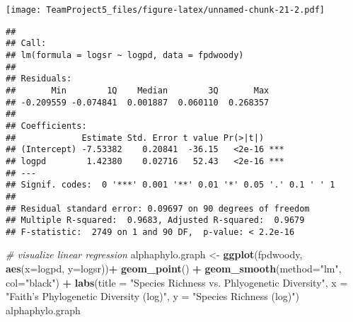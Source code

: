 \documentclass[
]{article}
\newenvironment{Shaded}{\begin{snugshade}}{\end{snugshade}}
\newcommand{\CommentTok}[1]{\textcolor[rgb]{0.56,0.35,0.01}{\textit{#1}}}
\newcommand{\DataTypeTok}[1]{\textcolor[rgb]{0.13,0.29,0.53}{#1}}
\newcommand{\KeywordTok}[1]{\textcolor[rgb]{0.13,0.29,0.53}{\textbf{#1}}}
\newcommand{\NormalTok}[1]{#1}
\newcommand{\OperatorTok}[1]{\textcolor[rgb]{0.81,0.36,0.00}{\textbf{#1}}}
\newcommand{\StringTok}[1]{\textcolor[rgb]{0.31,0.60,0.02}{#1}}
\begin{document}
\texttt{[image: TeamProject5\_files/figure-latex/unnamed-chunk-21-2.pdf]}

\begin{Shaded}
\end{Shaded}

\begin{verbatim}
## 
## Call:
## lm(formula = logsr ~ logpd, data = fpdwoody)
## 
## Residuals:
##       Min        1Q    Median        3Q       Max 
## -0.209559 -0.074841  0.001887  0.060110  0.268357 
## 
## Coefficients:
##             Estimate Std. Error t value Pr(>|t|)    
## (Intercept) -7.53382    0.20841  -36.15   <2e-16 ***
## logpd        1.42380    0.02716   52.43   <2e-16 ***
## ---
## Signif. codes:  0 '***' 0.001 '**' 0.01 '*' 0.05 '.' 0.1 ' ' 1
## 
## Residual standard error: 0.09697 on 90 degrees of freedom
## Multiple R-squared:  0.9683, Adjusted R-squared:  0.9679 
## F-statistic:  2749 on 1 and 90 DF,  p-value: < 2.2e-16
\end{verbatim}

\begin{Shaded}
\begin{Highlighting}[]
\CommentTok{# visualize linear regression}
\NormalTok{alphaphylo.graph <-}\StringTok{ }\KeywordTok{ggplot}\NormalTok{(fpdwoody, }\KeywordTok{aes}\NormalTok{(}\DataTypeTok{x=}\NormalTok{logpd, }\DataTypeTok{y=}\NormalTok{logsr))}\OperatorTok{+}
\StringTok{                     }\KeywordTok{geom_point}\NormalTok{() }\OperatorTok{+}\StringTok{ }\KeywordTok{geom_smooth}\NormalTok{(}\DataTypeTok{method=}\StringTok{"lm"}\NormalTok{, }\DataTypeTok{col=}\StringTok{"black"}\NormalTok{) }\OperatorTok{+}\StringTok{ }\KeywordTok{labs}\NormalTok{(}\DataTypeTok{title =} \StringTok{"Species Richness vs. Phlyogenetic Diversity"}\NormalTok{,}
      \DataTypeTok{x =} \StringTok{"Faith's Phylogenetic Diversity (log)"}\NormalTok{,}
      \DataTypeTok{y =} \StringTok{"Species Richness (log)"}\NormalTok{)}
\NormalTok{alphaphylo.graph}
\end{Highlighting}
\end{Shaded}
\end{document}
